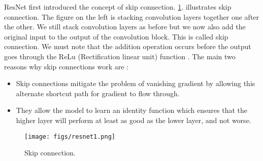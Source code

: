 ResNet first introduced the concept of skip connection. \cref{fig:resnet1}. illustrates skip connection. The figure on the left is stacking convolution layers together one after the other. We still stack convolution layers as before but we now also add the original input to the output of the convolution block. This is called skip connection. We must note that the addition operation occurs before the output goes through the ReLu (Rectification linear unit) function \cite{b13}.
The main two reasons why skip connections work are :

\begin{itemize}
  \item Skip connections mitigate the problem of vanishing gradient by allowing this alternate shortcut path for gradient to flow through.
  \item They allow the model to learn an identity function which ensures that the higher layer will perform at least as good as the lower layer, and not worse.
\end{itemize}

\begin{figure}[!htpb]
	\centering
	\texttt{[image: figs/resnet1.png]}
	\caption{Skip connection.}\label{fig:resnet1}
\end{figure}

